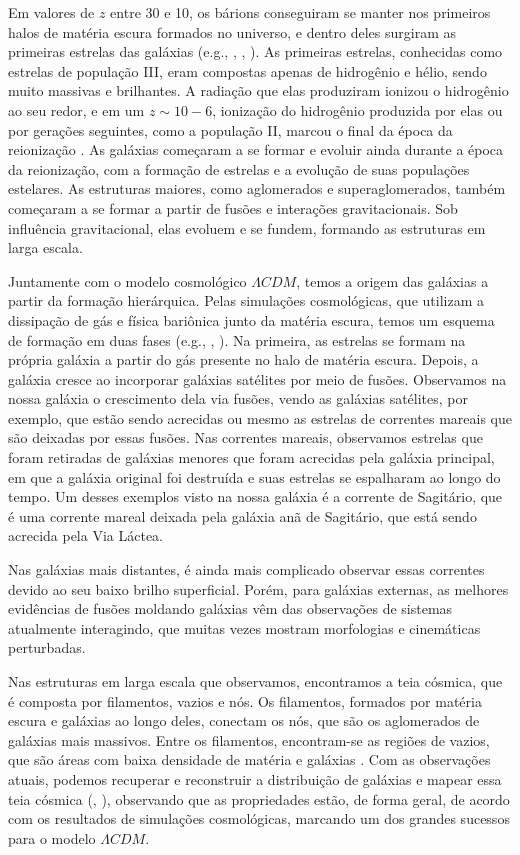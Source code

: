 Em valores de $z$ entre 30 e 10, os bárions conseguiram se manter nos primeiros halos de matéria escura formados no universo, e dentro deles surgiram as primeiras estrelas das galáxias (e.g., \citealp{Glover_2005}, \citealp{Greif_2015}, \citealp{Schauer_2021}). As primeiras estrelas, conhecidas como estrelas de população III, eram compostas apenas de hidrogênio e hélio, sendo muito massivas e brilhantes. A radiação que elas produziram ionizou o hidrogênio ao seu redor, e em um $z \sim 10-6$, ionização do hidrogênio produzida por elas ou por gerações seguintes, como a população II, marcou o final da época da reionização \citep{Wise_2019}. As galáxias começaram a se formar e evoluir ainda durante a época da reionização, com a formação de estrelas e a evolução de suas populações estelares. As estruturas maiores, como aglomerados e superaglomerados, também começaram a se formar a partir de fusões e interações gravitacionais. Sob influência gravitacional, elas evoluem e se fundem, formando as estruturas em larga escala.

Juntamente com o modelo cosmológico $\Lambda CDM$, temos a origem das galáxias a partir da formação hierárquica. Pelas simulações cosmológicas, que utilizam a dissipação de gás e física bariônica junto da matéria escura, temos um esquema de formação em duas fases (e.g., \citealp{Oser_2010}, \citealp{Pillepich_2014}). Na primeira, as estrelas se formam na própria galáxia a partir do gás presente no halo de matéria escura. Depois, a galáxia cresce ao incorporar galáxias satélites por meio de fusões. Observamos na nossa galáxia o crescimento dela via fusões, vendo as galáxias satélites, por exemplo, que estão sendo acrecidas ou mesmo as estrelas de correntes mareais que são deixadas por essas fusões. Nas correntes mareais, observamos estrelas que foram retiradas de galáxias menores que foram acrecidas pela galáxia principal, em que a galáxia original foi destruída e suas estrelas se espalharam ao longo do tempo. Um desses exemplos visto na nossa galáxia é a corrente de Sagitário, que é uma corrente mareal deixada pela galáxia anã de Sagitário, que está sendo acrecida pela Via Láctea.

Nas galáxias mais distantes, é ainda mais complicado observar essas correntes devido ao seu baixo brilho superficial. Porém, para galáxias externas, as melhores evidências de fusões moldando galáxias vêm das observações de sistemas atualmente interagindo, que muitas vezes mostram morfologias e cinemáticas perturbadas.

Nas estruturas em larga escala que observamos, encontramos a teia cósmica, que é composta por filamentos, vazios e nós. Os filamentos, formados por matéria escura e galáxias ao longo deles, conectam os nós, que são os aglomerados de galáxias mais massivos. Entre os filamentos, encontram-se as regiões de vazios, que são áreas com baixa densidade de matéria e galáxias \citep{Lindner_1995}. Com as observações atuais, podemos recuperar e reconstruir a distribuição de galáxias e mapear essa teia cósmica (\citealp{Lindner_1995}, \citealp{Abazajian_2003}), observando que as propriedades estão, de forma geral, de acordo com os resultados de simulações cosmológicas, marcando um dos grandes sucessos para o modelo $\Lambda CDM$.

